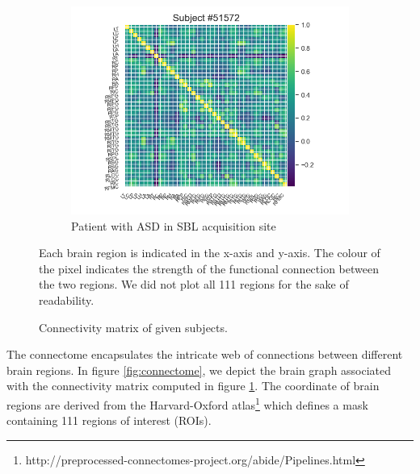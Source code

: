 \begin{figure}[h!]
    \hfill
    \begin{subfigure}{0.3\textwidth}
        \centering
        \includegraphics[width=\textwidth]{figures/ex_connectivity_matrix_sbl_ASD.png}
        \caption{\centering Patient with ASD in SBL acquisition site \qquad }
        \Description{}
    \end{subfigure}
    \caption{Connectivity matrix of given subjects.} Each brain region is indicated in the x-axis and y-axis. The colour of the pixel indicates the strength of the functional connection between the two regions. We did not plot all 111 regions for the sake of readability.
    \Description{}
    \label{fig:connectivity_matrix}
\end{figure}

The connectome encapsulates the intricate web of connections between different brain regions. In figure \ref{fig:connectome}, we depict the brain graph associated with the connectivity matrix computed in figure \ref{fig:connectivity_matrix}. The coordinate of brain regions are derived from the Harvard-Oxford atlas\footnote{http://preprocessed-connectomes-project.org/abide/Pipelines.html} which defines a mask containing 111 regions of interest (ROIs).

